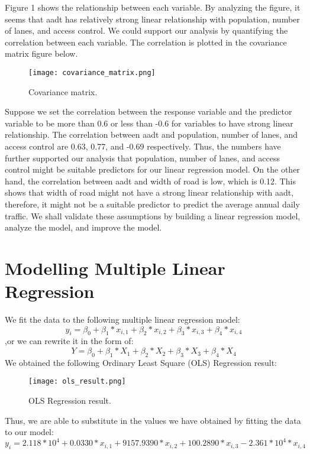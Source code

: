\documentclass[english]{article}
\begin{document}
Figure 1 shows the relationship between each variable. By analyzing the figure, it seems that aadt has relatively strong linear relationship with population, number of lanes, and access control. We could support our analysis by quantifying the correlation between each variable. The correlation is plotted in the covariance matrix figure below. 

\begin{figure}[H]
	\begin{centering}
  		\texttt{[image: covariance\_matrix.png]}
  		\caption{Covariance matrix.\label{figure2}
}
	\end{centering}
\end{figure}
Suppose we set the correlation between the response variable and the predictor variable to be more than 0.6 or less than -0.6 for variables to have strong linear relationship. The correlation between aadt and population, number of lanes, and access control are 0.63, 0.77, and -0.69 respectively. Thus, the numbers have further supported our analysis that population, number of lanes, and access control might be suitable predictors for our linear regression model. On the other hand, the correlation between aadt and width of road is low, which is 0.12. This shows that width of road might not have a strong linear relationship with aadt, therefore, it might not be a suitable predictor to predict the average annual daily traffic. We shall validate these assumptions by building a linear regression model, analyze the model, and improve the model. 
 
\section{Modelling Multiple Linear Regression}\label{methods}
We fit the data to the following multiple linear regression model: 
$$ y_i = \beta_0 + \beta_1 * x_{i,1} + \beta_2 * x_{i,2} + \beta_3 * x_{i,3} + \beta_4 * x_{i,4} $$
,or we can rewrite it in the form of: 
$$ Y = \beta_0 + \beta_1 * X_{1} + \beta_2 * X_{2} + \beta_3 * X_{3} + \beta_4 * X_{4} $$
We obtained the following Ordinary Least Square (OLS) Regression result:
\begin{figure}[H]
	\begin{centering}
  		\texttt{[image: ols\_result.png]}
  		\caption{OLS Regression result.\label{figure3}
}
	\end{centering}
\end{figure}
Thus, we are able to substitute in the values we have obtained by fitting the data to our model:
$$ y_i = 2.118 * 10^{4} + 0.0330 * x_{i,1} + 9157.9390 * x_{i,2} + 100.2890 * x_{i,3} - 2.361 * 10^{4} * x_{i,4}$$ 
\end{document}
